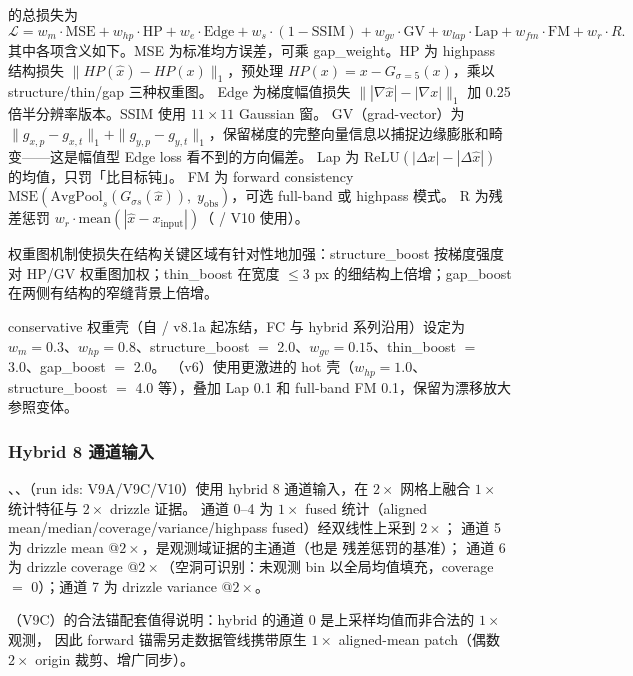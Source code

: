  的总损失为
\[
  \mathcal{L} = w_m \cdot \text{MSE} + w_{hp} \cdot \text{HP} + w_e \cdot \text{Edge} + w_s \cdot (1 - \text{SSIM}) + w_{gv} \cdot \text{GV} + w_{lap} \cdot \text{Lap} + w_{fm} \cdot \text{FM} + w_r \cdot R.
\]
其中各项含义如下。MSE 为标准均方误差，可乘 gap\_weight。HP 为 highpass 结构损失 \(\|HP(\hat{x}) - HP(x)\|_1\)，预处理 \(HP(x) = x - G_{\sigma=5}(x)\)，乘以 structure/thin/gap 三种权重图。
Edge 为梯度幅值损失 \(\||\nabla\hat{x}| - |\nabla x|\|_1\) 加 0.25 倍半分辨率版本。SSIM 使用 \(11 \times 11\) Gaussian 窗。
GV（grad-vector）为 \(\|g_{x,p} - g_{x,t}\|_1 + \|g_{y,p} - g_{y,t}\|_1\)，保留梯度的完整向量信息以捕捉边缘膨胀和畸变——这是幅值型 Edge loss 看不到的方向偏差。
Lap 为 \(\text{ReLU}(|\Delta x| - |\Delta\hat{x}|)\) 的均值，只罚「比目标钝」。
FM 为 forward consistency \(\text{MSE}(\text{AvgPool}_s(G_{\sigma s}(\hat{x})),\; y_{\text{obs}})\)，可选 full-band 或 highpass 模式。
R 为残差惩罚 \(w_r \cdot \text{mean}(|\hat{x} - x_{\text{input}}|)\)（ / V10 使用）。

权重图机制使损失在结构关键区域有针对性地加强：structure\_boost 按梯度强度对 HP/GV 权重图加权；thin\_boost 在宽度 \(\le 3\)  px 的细结构上倍增；gap\_boost 在两侧有结构的窄缝背景上倍增。

conservative 权重壳（自  / v8.1a 起冻结，FC 与 hybrid 系列沿用）设定为 \(w_m = 0.3\)、\(w_{hp} = 0.8\)、structure\_boost \(=\) 2.0、\(w_{gv} = 0.15\)、thin\_boost \(=\) 3.0、gap\_boost \(=\) 2.0。
（v6）使用更激进的 hot 壳（\(w_{hp} = 1.0\)、structure\_boost \(=\) 4.0 等），叠加 Lap 0.1 和 full-band FM 0.1，保留为漂移放大参照变体。

\subsubsection{Hybrid 8 通道输入}

、、（run ids: V9A/V9C/V10）使用 hybrid 8 通道输入，在 \(2\times\) 网格上融合 \(1\times\) 统计特征与 \(2\times\) drizzle 证据。
通道 0--4 为 \(1\times\) fused 统计（aligned mean/median/coverage/variance/highpass fused）经双线性上采到 \(2\times\)；
通道 5 为 drizzle mean @\(2\times\)，是观测域证据的主通道（也是  残差惩罚的基准）；
通道 6 为 drizzle coverage @\(2\times\)（空洞可识别：未观测 bin 以全局均值填充，coverage \(=\) 0）；通道 7 为 drizzle variance @\(2\times\)。

（V9C）的合法锚配套值得说明：hybrid 的通道 0 是上采样均值而非合法的 \(1\times\) 观测，
因此 forward 锚需另走数据管线携带原生 \(1\times\) aligned-mean patch（偶数 \(2\times\) origin 裁剪、增广同步）。

